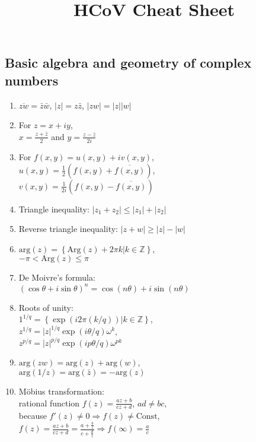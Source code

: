 \documentclass[11pt,a4paper]{article}
\title{HCoV Cheat Sheet}
\begin{document}
\begin{multicols}{2}

\section*{Basic algebra and geometry of complex numbers}
\begin{enumerate}

\item $\overline{zw}=\bar{z}\bar{w}$, $|z|=z\bar{z}$, $|zw|=|z||w|$

\item For $z=x+iy$, \\$x= \frac{z + \bar{z}}{2}$ and $y= \frac{z - \bar{z}}{2i}$

\item For $f(x,y) = u(x,y) + i v(x,y)$, \\$u(x,y) = \frac{1}{2} \left( f(x,y) + \overline{f(x,y)} \right)$, \\$v(x,y) = \frac{1}{2i} \left( f(x,y) - \overline{f(x,y)} \right)$

\item Triangle inequality: $|z_1+z_2| \leq |z_1|+|z_2|$

\item Reverse triangle inequality: $|z+w| \geq |z|-|w|$

\item $\mathrm{arg}(z) = \left\{ \mathrm{Arg} (z) + 2 \pi k | k \in \mathbb{Z} \right\}$, \\$-\pi < \mathrm{Arg}(z) \leq \pi$

\item De Moivre's formula: \\$\left( \cos \theta + i \sin \theta \right) ^n = \cos (n\theta) + i \sin (n\theta)$

\item Roots of unity: \\$1^{1/q} = \left\{ \exp \left( i 2 \pi (k/q) \right) | k \in \mathbb{Z} \right\}$, \\$z^{1/q} = |z|^{1/q} \exp (i\theta/q) \omega^k$, \\$z^{p/q} = |z|^{p/q} \exp (ip\theta/q) \omega^{pk}$

\item $\mathrm{arg}(zw) = \mathrm{arg}(z) + \mathrm{arg}(w)$, \\$\mathrm{arg}(1/z) = \mathrm{arg}(\bar{z}) = -\mathrm{arg}(z)$

\item M\"obius transformation: \\rational function $f(z) = \frac{az+b}{cz+d}$, $ad \neq bc$, \\because $f'(z) \neq 0 \Rightarrow f(z) \neq \text{Const}$, \\$f(z) = \frac{az+b}{cz+d} = \frac{a+\frac{b}{z}}{c+\frac{d}{z}} \Rightarrow f(\infty) = \frac{a}{c}$


\end{enumerate}
\end{multicols}
\end{document}
